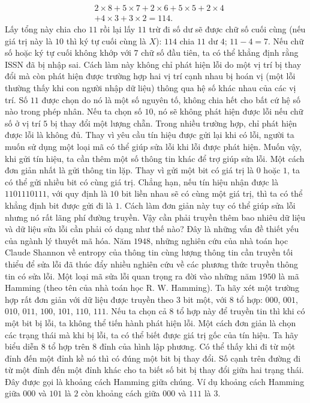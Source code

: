 \begin{multicols}{2}
	\begin{align*}
		&2\times8+5\times7+2\times6+5\times5+2\times4\\
		&+4\times3+3\times2=114.
	\end{align*}
	Lấy tổng này chia cho $11$ rồi lại lấy $11$ trừ đi số dư sẽ được chữ số cuối cùng (nếu giá trị này là $10$ thì ký tự cuối cùng là $X$): $114$ chia $11$ dư $4$; $11 - 4 = 7$.
	\vskip 0.1cm
	Nếu chữ số hoặc ký tự cuối không khớp với $7$ chữ số đầu tiên, ta có thể khẳng định rằng ISSN đã bị nhập sai. Cách làm này không chỉ phát hiện lỗi do một vị trí bị thay đổi mà còn phát hiện được trường hợp hai vị trí cạnh nhau bị hoán vị (một lỗi thường thấy khi con người nhập dữ liệu) thông qua hệ số khác nhau của các vị trí. Số $11$ được chọn do nó là một số nguyên tố, không chia hết cho bất cứ hệ số nào trong phép nhân. Nếu ta chọn số $10$, nó sẽ không phát hiện được lỗi nếu chữ số ở vị trí $5$ bị thay đổi một lượng chẵn.
	\vskip 0.1cm
	Trong nhiều trường hợp, chỉ phát hiện được lỗi là không đủ. Thay vì yêu cầu tín hiệu được gửi lại khi có lỗi, người ta muốn sử dụng một loại mã có thể giúp sửa lỗi khi lỗi được phát hiện. Muốn vậy, khi gửi tín hiệu, ta cần thêm một số thông tin khác để trợ giúp sửa lỗi.
	\vskip 0.1cm
	Một cách đơn giản nhất là gửi thông tin lặp. Thay vì gửi một bit có giá trị là $0$ hoặc $1$, ta có thể gửi nhiều bit có cùng giá trị. Chẳng hạn, nếu tín hiệu nhận được là $1101110111$, với quy định là $10$ bit liền nhau sẽ có cùng một giá trị, thì ta có thể khẳng định bit được gửi đi là $1$. Cách làm đơn giản này tuy có thể giúp sửa lỗi nhưng nó rất lãng phí đường truyền.
	\vskip 0.1cm
	Vậy cần phải truyền thêm bao nhiêu dữ liệu và dữ liệu sửa lỗi cần phải có dạng như thế nào? Đây là những vấn đề thiết yếu của ngành lý thuyết mã hóa.
	\vskip 0.1cm
	Năm $1948$, những nghiên cứu của nhà toán học Claude Shannon về entropy của thông tin cùng lượng thông tin cần truyền tối thiểu để sửa lỗi đã thúc đẩy nhiều nghiên cứu về các phương thức truyền thông tin có sửa lỗi.
	\vskip 0.1cm
	Một loại mã sửa lỗi quan trọng ra đời vào những năm $1950$ là mã Hamming (theo tên của nhà toán học R. W. Hamming). Ta hãy xét một trường hợp rất đơn giản với dữ liệu được truyền theo $3$ bit một, với $8$ tổ hợp: $000$, $001$, $010$, $011$, $100$, $101$, $110$, $111$. Nếu ta chọn cả $8$ tổ hợp này để truyền tin thì khi có một bit bị lỗi, ta không thể tiến hành phát hiện lỗi. Một cách đơn giản là chọn các trạng thái mà khi bị lỗi, ta có thể biết được giá trị gốc của tín hiệu.
	\vskip 0.1cm
	Ta hãy biểu diễn $8$ tổ hợp trên $8$ đỉnh của hình lập phương. Có thể thấy khi đi từ một đỉnh đến một đỉnh kề nó thì có đúng một bit bị thay đổi. Số cạnh trên đường đi từ một đỉnh đến một đỉnh khác cho ta biết số bit bị thay đổi giữa hai trạng thái. Đây được gọi là khoảng cách Hamming giữa chúng. Ví dụ khoảng cách Hamming giữa $000$ và $101$ là $2$ còn khoảng cách giữa $000$ và $111$ là $3$.

\end{multicols}

